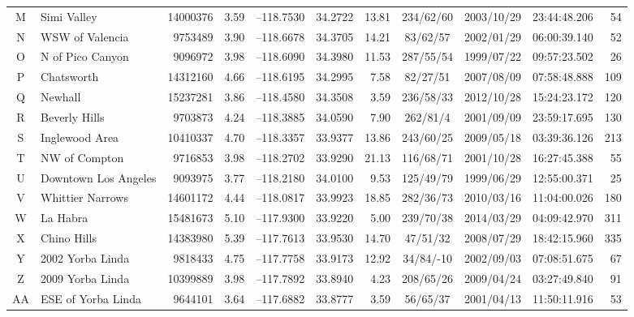\begin{table*}
\begin{tabular}[t]{@{} c l r c r@{, }l r c c c r}
		M	& Simi Valley			&	14000376	&	3.59	&	--118.7530	&	34.2722	&	13.81	&	234/62/60	&	2003/10/29	&	23:44:48.206	&	54	\\ %
		N	& WSW of Valencia		&	 9753489	&	3.90	&	--118.6678	&	34.3705	&	14.21	&	 83/62/57	&	2002/01/29	&	06:00:39.140	&	52	\\ %
		O	& N of Pico Canyon		&	 9096972	&	3.98	&	--118.6090	&	34.3980	&	11.53	&	287/55/54	&	1999/07/22	&	09:57:23.502	&	26	\\ %
		P	& Chatsworth			&	14312160	&	4.66	&	--118.6195	&	34.2995	&	 7.58	&	 82/27/51	&	2007/08/09	&	07:58:48.888	&	109	\\ %
		Q	& Newhall				&	15237281	&	3.86	&	--118.4580	&	34.3508	&	 3.59	&	236/58/33	&	2012/10/28	&	15:24:23.172	&	120	\\ %
																					
		R	& Beverly Hills			&	 9703873	&	4.24	&	--118.3885	&	34.0590	&	 7.90	&	262/81/4	&	2001/09/09	&	23:59:17.695	&	130	\\ %
		S	& Inglewood Area		&	10410337	&	4.70	&	--118.3357	&	33.9377	&	13.86	&	243/60/25	&	2009/05/18	&	03:39:36.126	&	213	\\ %
		T	& NW of Compton			&	 9716853	&	3.98	&	--118.2702	&	33.9290	&	21.13	&	116/68/71	&	2001/10/28	&	16:27:45.388	&	55	\\ %
																					
		U	& Downtown Los Angeles	&	 9093975	&	3.77	&	--118.2180	&	34.0100	&	 9.53	&	125/49/79	&	1999/06/29	&	12:55:00.371	&	25	\\ %
																					
		V	& Whittier Narrows		&	14601172	&	4.44	&	--118.0817	&	33.9923	&	18.85	&	282/36/73	&	2010/03/16	&	11:04:00.026	&	180	\\ %
		W	& La Habra				&	15481673	&	5.10	&	--117.9300	&	33.9220	&	 5.00	&	239/70/38	&	2014/03/29	&	04:09:42.970	&	311	\\ %
		X	& Chino Hills			&	14383980	&	5.39	&	--117.7613	&	33.9530	&	14.70	&	 47/51/32	&	2008/07/29	&	18:42:15.960	&	335	\\ %
		Y	& 2002 Yorba Linda		&	 9818433	&	4.75	&	--117.7758	&	33.9173	&	12.92	&	 34/84/-10	&	2002/09/03	&	07:08:51.675	&	67	\\ %
		Z	& 2009 Yorba Linda		&	10399889	&	3.98	&	--117.7892	&	33.8940	&	 4.23	&	208/65/26	&	2009/04/24	&	03:27:49.840	&	91	\\ %
		AA	& ESE of Yorba Linda	&	 9644101	&	3.64	&	--117.6882	&	33.8777	&	 3.59	&	 56/65/37	&	2001/04/13	&	11:50:11.916	&	53	\\ %
																					

\end{tabular}
\end{table*}
